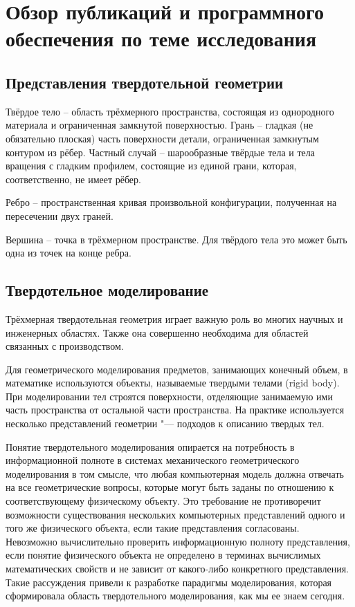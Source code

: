 \chapter{Обзор публикаций и программного обеспечения по теме исследования} \label{chapt1}


\section{Представления твердотельной геометрии} \label{sect1_1}

Твёрдое тело – область трёхмерного пространства, состоящая из однородного материала и ограниченная замкнутой поверхностью.
Грань – гладкая (не обязательно плоская) часть поверхности детали, ограниченная замкнутым контуром из рёбер. Частный случай – шарообразные твёрдые тела и тела вращения с гладким профилем, состоящие из единой грани, которая, соответственно, не имеет рёбер.

Ребро – пространственная кривая произвольной конфигурации, полученная на пересечении двух граней.

Вершина – точка в трёхмерном пространстве. Для твёрдого тела это может быть одна из точек на конце ребра.

\section{Твердотельное моделирование} \label{solid_modeling}

Трёхмерная твердотельная геометрия играет важную роль во многих научных и инженерных областях. Также она совершенно необходима для областей связанных с производством.

Для геометрического моделирования предметов, занимающих конечный объем, в математике используются объекты, называемые твердыми телами (rigid body). При моделировании тел строятся поверхности, отделяющие занимаемую ими часть пространства от остальной части пространства. На практике используется несколько представлений геометрии "--- подходов к описанию твердых тел.

Понятие твердотельного моделирования опирается на потребность в информационной полноте в системах механического геометрического моделирования в том смысле, что любая компьютерная модель должна отвечать на все геометрические вопросы, которые могут быть заданы по отношению к соответствующему физическому объекту. Это требование не противоречит возможности существования нескольких компьютерных представлений одного и того же физического объекта, если такие представления согласованы. Невозможно вычислительно проверить информационную полноту представления, если понятие физического объекта не определено в терминах вычислимых математических свойств и не зависит от какого-либо конкретного представления. Такие рассуждения привели к разработке парадигмы моделирования, которая сформировала область твердотельного моделирования, как мы ее знаем сегодня.

